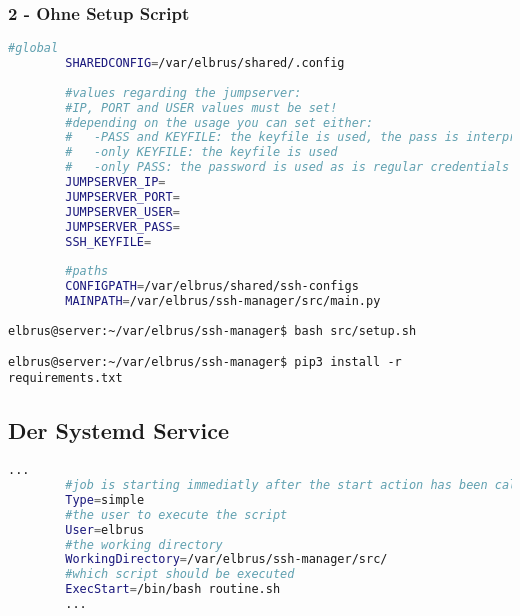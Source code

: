 	\subsubsection{2 - Ohne Setup Script}
	
	\lstset{style=files}
	\begin{lstlisting}[caption={Anhand von '.env.example' eigene '.env' Datei anlegen.}, language=bash]
		#global
		SHAREDCONFIG=/var/elbrus/shared/.config
		
		#values regarding the jumpserver:
		#IP, PORT and USER values must be set!
		#depending on the usage you can set either:
		#   -PASS and KEYFILE: the keyfile is used, the pass is interpreted as the passphrase
		#   -only KEYFILE: the keyfile is used
		#   -only PASS: the password is used as is regular credentials
		JUMPSERVER_IP=
		JUMPSERVER_PORT=
		JUMPSERVER_USER=
		JUMPSERVER_PASS=
		SSH_KEYFILE=
		
		#paths
		CONFIGPATH=/var/elbrus/shared/ssh-configs
		MAINPATH=/var/elbrus/ssh-manager/src/main.py
	\end{lstlisting}
	
	\lstset{style=commands}	
	\begin{lstlisting}[caption={Ausführen des Scripts zur Initialisierung des VCS Verzeichnisses.}]
		elbrus@server:~/var/elbrus/ssh-manager$ bash src/setup.sh
	\end{lstlisting}
	
	\lstset{style=commands}
	\begin{lstlisting}[caption={Installieren von fehlenden python3 Packages.}]
		elbrus@server:~/var/elbrus/ssh-manager$ pip3 install -r requirements.txt
	\end{lstlisting}
	\newpage
	
	\subsection[systemd service]{Der Systemd Service}
	
	\lstset{style=files}
	\begin{lstlisting}[caption={ssh-manager.service.example - Die Variable 'WorkingDirectory' sowie die Variable 'User' anpassen.},language=bash ,keywords={WorkingDirectory, User}, keywordstyle=\color{red}, firstnumber=5]
		...
		#job is starting immediatly after the start action has been called
		Type=simple
		#the user to execute the script
		User=elbrus
		#the working directory
		WorkingDirectory=/var/elbrus/ssh-manager/src/
		#which script should be executed
		ExecStart=/bin/bash routine.sh
		...
	\end{lstlisting}
	
